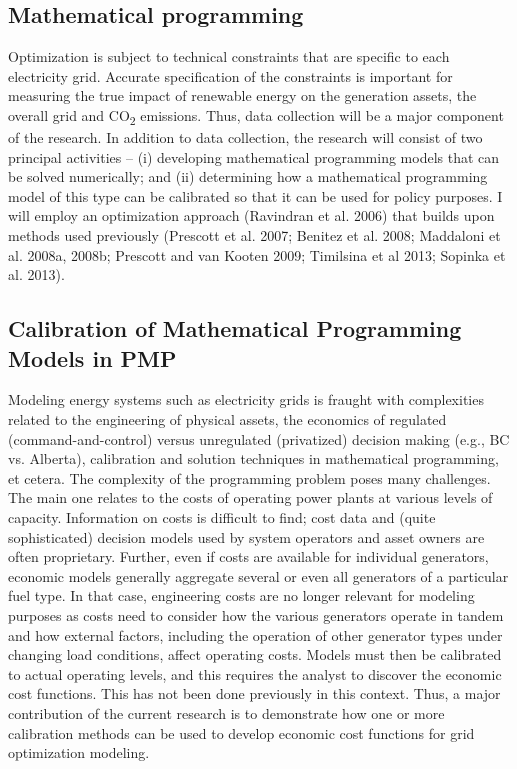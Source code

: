 \subsection{Mathematical programming}\label{mathematical-programming}

Optimization is subject to technical constraints that are specific to
each electricity grid. Accurate specification of the constraints is
important for measuring the true impact of renewable energy on the
generation assets, the overall grid and CO\textsubscript{2} emissions.
Thus, data collection will be a major component of the research. In
addition to data collection, the research will consist of two principal
activities -- (i) developing mathematical programming models that can be
solved numerically; and (ii) determining how a mathematical programming
model of this type can be calibrated so that it can be used for policy
purposes. I will employ an optimization approach (Ravindran et al. 2006)
that builds upon methods used previously (Prescott et al. 2007; Benitez
et al. 2008; Maddaloni et al. 2008a, 2008b; Prescott and van Kooten
2009; Timilsina et al 2013; Sopinka et al. 2013).

\subsection{Calibration of Mathematical Programming Models in
PMP}\label{calibration-of-mathematical-programming-models-in-pmp}

Modeling energy systems such as electricity grids is fraught with
complexities related to the engineering of physical assets, the
economics of regulated (command-and-control) versus unregulated
(privatized) decision making (e.g., BC vs. Alberta), calibration and
solution techniques in mathematical programming, et cetera. The
complexity of the programming problem poses many challenges. The main
one relates to the costs of operating power plants at various levels of
capacity. Information on costs is difficult to find; cost data and
(quite sophisticated) decision models used by system operators and asset
owners are often proprietary. Further, even if costs are available for
individual generators, economic models generally aggregate several or
even all generators of a particular fuel type. In that case, engineering
costs are no longer relevant for modeling purposes as costs need to
consider how the various generators operate in tandem and how external
factors, including the operation of other generator types under changing
load conditions, affect operating costs. Models must then be calibrated
to actual operating levels, and this requires the analyst to discover
the economic cost functions. This has not been done previously in this
context. Thus, a major contribution of the current research is to
demonstrate how one or more calibration methods can be used to develop
economic cost functions for grid optimization modeling.

